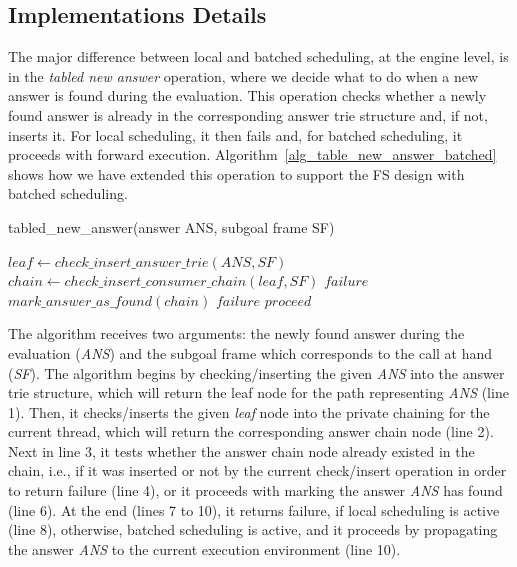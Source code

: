 \documentclass{llncs}
\begin{document}

\subsection{Implementations Details}

The major difference between local and batched scheduling, at the
engine level, is in the \emph{tabled new answer} operation, where we
decide what to do when a new answer is found during the
evaluation. This operation checks whether a newly found answer is
already in the corresponding answer trie structure and, if not,
inserts it. For local scheduling, it then fails and, for batched
scheduling, it proceeds with forward
execution. Algorithm~\ref{alg_table_new_answer_batched} shows how we
have extended this operation to support the FS design with batched
scheduling.

\vspace{-\bigskipamount}
\begin{algorithm} [!ht]
\caption{tabled\_new\_answer(answer ANS, subgoal frame SF)}
\begin{algorithmic}[1]
  \STATE $leaf \gets check\_insert\_answer\_trie(ANS, SF)$
  \STATE $chain \gets check\_insert\_consumer\_chain(leaf, SF)$
    \RETURN $failure$
    \STATE $mark\_answer\_as\_found(chain)$
      \RETURN $failure$
      \RETURN $proceed$
    \ENDIF
  \ENDIF  
\end{algorithmic}
\label{alg_table_new_answer_batched}
\end{algorithm}
\vspace{-\bigskipamount}

The algorithm receives two arguments: the newly found answer during
the evaluation (\emph{ANS}) and the subgoal frame which corresponds to
the call at hand (\emph{SF}). The algorithm begins by
checking/inserting the given \emph{ANS} into the answer trie
structure, which will return the leaf node for the path representing
\emph{ANS} (line 1). Then, it checks/inserts the given \emph{leaf}
node into the private chaining for the current thread, which will
return the corresponding answer chain node (line 2). Next in line 3,
it tests whether the answer chain node already existed in the chain,
i.e., if it was inserted or not by the current check/insert operation
in order to return failure (line 4), or it proceeds with marking the
answer \emph{ANS} has found (line 6). At the end (lines 7 to 10), it
returns failure, if local scheduling is active (line 8), otherwise,
batched scheduling is active, and it proceeds by propagating the
answer \emph{ANS} to the current execution environment (line 10).
\end{document}
